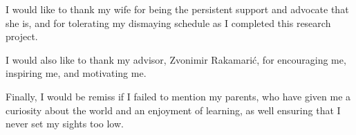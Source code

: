 I would like to thank my wife for being the persistent support and
advocate that she is, and for tolerating my dismaying schedule as I
completed this research project. 

I would also like to thank my advisor, Zvonimir Rakamarić, for
encouraging me, inspiring me, and motivating me. 

Finally, I would be remiss if I failed to mention my parents, who have
given me a curiosity about the world and an enjoyment of learning, as
well ensuring that I never set my sights too low.

